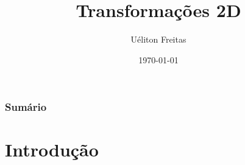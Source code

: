 \documentclass{beamer}
\title[Computação Gráfica]{Transformações 2D} %
\author{Uéliton Freitas} %
\institute[UFMS] %
{
Universidade Católica Don Bosco - UCDB \\ %
\medskip
\textit{freitas.ueliton@gmail.com} %
}
\date{\today} %
\begin{document}
\begin{frame}
\titlepage %
\end{frame}

\begin{frame}
\frametitle{Sumário} %
\tableofcontents %
\end{frame}





\section{Introdução} 

\end{document}
